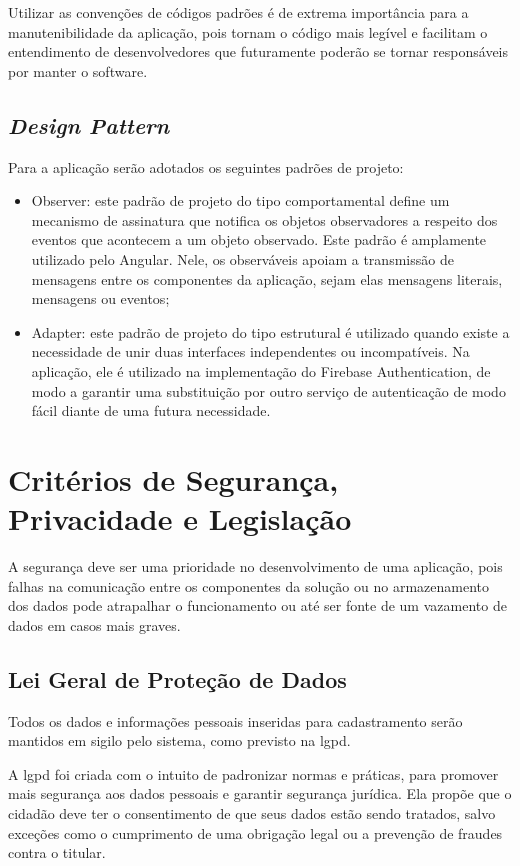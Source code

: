\documentclass[
    12pt,               %
    openright,          %
    oneside,
    a4paper,            %
    english,            %
    brazil              %
    ]{ifsp-spo-inf-ctds} %
\begin{document}
Utilizar as convenções de códigos padrões é de extrema importância para a manutenibilidade da aplicação, pois tornam o código mais legível e facilitam o entendimento de desenvolvedores que futuramente poderão se tornar responsáveis por manter o software.



\subsection{\textit{Design Pattern}}
Para a aplicação serão adotados os seguintes padrões de projeto:
\begin{itemize}
\item  Observer: este padrão de projeto do tipo comportamental define um mecanismo de assinatura que notifica os objetos observadores a respeito dos eventos que acontecem a um objeto observado. 
Este padrão é amplamente utilizado pelo Angular. Nele, os observáveis apoiam a transmissão de mensagens entre os componentes da aplicação, sejam elas mensagens literais, mensagens ou eventos;
\item Adapter: este padrão de projeto do tipo estrutural é utilizado quando existe a necessidade de unir duas interfaces independentes ou incompatíveis. Na aplicação, ele é utilizado na implementação do Firebase Authentication, de modo a garantir uma substituição por outro serviço de autenticação de modo fácil diante de uma futura necessidade.
\end{itemize}

\section {Critérios de Segurança, Privacidade e Legislação}
A segurança deve ser uma prioridade no desenvolvimento de uma aplicação, pois falhas na comunicação entre os componentes da solução ou no armazenamento dos dados pode atrapalhar o funcionamento ou até ser fonte de um vazamento de dados em casos mais graves. 

\subsection{Lei Geral de Proteção de Dados}
Todos os dados e informações pessoais inseridas para cadastramento serão mantidos em sigilo pelo sistema, como previsto na \ac{lgpd}.

A \ac{lgpd} foi criada com o intuito de padronizar normas e práticas, para promover mais segurança aos dados pessoais e garantir segurança jurídica. Ela propõe que o cidadão deve ter o consentimento de que seus dados estão sendo tratados, salvo exceções como o cumprimento de uma obrigação legal ou a prevenção de fraudes contra o titular.
\end{document}
